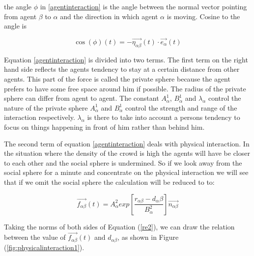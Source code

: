 the angle $\phi$ in \eqref{agentinteraction} is the angle between the normal 
vector pointing from agent $\beta$ to $\alpha$ and the direction in which 
agent $\alpha$ is moving. Cosine to the angle is 

\begin{equation}
\cos \left( \phi \right)
	\left( t \right) 
		= 
	- \vec{\eta_{\alpha \beta}}
		\left( t \right) 
	\cdot 
\vec{e_{\alpha}}\left( t \right)
\end{equation}

Equation \eqref{agentinteraction} is divided into two terms. The first term on 
the right hand side reflects the agents tendency to stay at a certain distance 
from other agents. This part of the force is called the private sphere because 
the agent prefers to have some free space around him if possible. The radius 
of the private sphere can differ from agent to agent. The constant 
$A_{\alpha}^{1}$, $B_{\alpha}^{1}$ and $\lambda_{\alpha}$ control the nature 
of the private sphere $A_{\alpha}^1$ and $B_{\alpha}^1$ control the strength 
and range of the interaction respectively. $\lambda_{\alpha}$ is there to take 
into account a persons tendency to focus on things happening in front of him 
rather than behind him.	%

The second term of equation \eqref{agentinteraction} deals with physical interaction.
In the situation where the density of the crowd is high the agents will have be closer
to each other and the social sphere is undermined. %
So if we look away from the social sphere for a minute and concentrate on the physical
interaction we will see that if we omit the social sphere the calculation will be reduced to
to:

\begin{equation}\label{re2}
\overrightarrow{f_{\alpha\beta}}(t) = A_{\alpha}^{2} exp\left[ \frac{r_{\alpha\beta} - d_{\alpha}\beta}{B_{\alpha}^{2}}\right]  \overrightarrow{n_{\alpha\beta}}
\end{equation}

Taking the norms of both sides of Equation (\ref{re2}), we can draw the relation between the value of $\overrightarrow{f_{\alpha\beta}}(t)$ and $ d_{\alpha\beta} $, as shown in Figure 
(\ref{fig:physicalinteraction1}).\\

